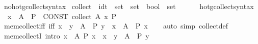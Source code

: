 \begin{isabellebody}
\ no{\isacharunderscore}{\kern0pt}hotg{\isacharunderscore}{\kern0pt}collect{\isacharunderscore}{\kern0pt}syntax\isanewline
{}\isanewline
{}\isamarkupfalse%
\ {\isachardoublequoteopen}{\isacharunderscore}{\kern0pt}collect{\isachardoublequoteclose}\ {\isacharcolon}{\kern0pt}{\isacharcolon}{\kern0pt}\ {\isacartoucheopen}idt\ {\isasymRightarrow}\ set\ {\isasymRightarrow}\ {\isacharparenleft}{\kern0pt}set\ {\isasymRightarrow}\ bool{\isacharparenright}{\kern0pt}\ {\isasymRightarrow}\ set{\isacartoucheclose}\ {\isacharparenleft}{\kern0pt}{\isachardoublequoteopen}{\isacharparenleft}{\kern0pt}{}{\isacharbraceleft}{\kern0pt}{\isacharunderscore}{\kern0pt}\ {\isasymin}\ {\isacharunderscore}{\kern0pt}\ {\isacharbar}{\kern0pt}{\isacharslash}{\kern0pt}\ {\isacharunderscore}{\kern0pt}{\isacharbraceright}{\kern0pt}{\isacharparenright}{\kern0pt}{\isachardoublequoteclose}{\isacharparenright}{\kern0pt}\isanewline
{}\isamarkupfalse%
\isanewline
{}\isamarkupfalse%
\ hotg{\isacharunderscore}{\kern0pt}collect{\isacharunderscore}{\kern0pt}syntax\isanewline
\isanewline
{}\isamarkupfalse%
\isanewline
\ \ {\isachardoublequoteopen}{\isacharbraceleft}{\kern0pt}x\ {\isasymin}\ A\ {\isacharbar}{\kern0pt}\ P{\isacharbraceright}{\kern0pt}{\isachardoublequoteclose}\ {\isasymrightleftharpoons}\ {\isachardoublequoteopen}CONST\ collect\ A\ {\isacharparenleft}{\kern0pt}{\isasymlambda}x{\isachardot}{\kern0pt}\ P{\isacharparenright}{\kern0pt}{\isachardoublequoteclose}\isanewline
\isanewline
\isanewline
\isanewline
{}\isamarkupfalse%
\ mem{\isacharunderscore}{\kern0pt}collect{\isacharunderscore}{\kern0pt}iff\ {\isacharbrackleft}{\kern0pt}iff{\isacharbrackright}{\kern0pt}{\isacharcolon}{\kern0pt}\ {\isachardoublequoteopen}x\ {\isasymin}\ {\isacharbraceleft}{\kern0pt}y\ {\isasymin}\ A\ {\isacharbar}{\kern0pt}\ P\ y{\isacharbraceright}{\kern0pt}\ {\isasymlongleftrightarrow}\ x\ {\isasymin}\ A\ {\isasymand}\ P\ x{\isachardoublequoteclose}\isanewline
%
\isadelimproof
\ \ %
\endisadelimproof
%
\isatagproof
{}\isamarkupfalse%
\ {\isacharparenleft}{\kern0pt}auto\ simp{\isacharcolon}{\kern0pt}\ collect{\isacharunderscore}{\kern0pt}def{\isacharparenright}{\kern0pt}%
\endisatagproof
{\isafoldproof}%
%
\isadelimproof
\isanewline
%
\endisadelimproof
\isanewline
{}\isamarkupfalse%
\ mem{\isacharunderscore}{\kern0pt}collectI\ {\isacharbrackleft}{\kern0pt}intro{\isacharbrackright}{\kern0pt}{\isacharcolon}{\kern0pt}\ {\isachardoublequoteopen}{\isasymlbrakk}x\ {\isasymin}\ A{\isacharsemicolon}{\kern0pt}\ P\ x{\isasymrbrakk}\ {\isasymLongrightarrow}\ x\ {\isasymin}\ {\isacharbraceleft}{\kern0pt}y\ {\isasymin}\ A\ {\isacharbar}{\kern0pt}\ P\ y{\isacharbraceright}{\kern0pt}{\isachardoublequoteclose}%

\end{isabellebody}
